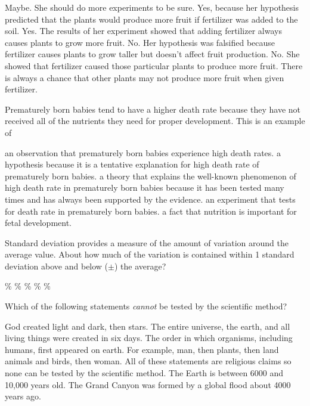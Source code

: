 \begin{choices}
\choice Maybe. She should do more experiments to be sure.
\choice Yes, because her hypothesis predicted that the plants would produce more fruit if fertilizer was added to the soil.
\choice Yes. The results of her experiment showed that adding fertilizer always causes plants to grow more fruit.
\choice No. Her hypothesis was falsified because fertilizer causes plants to grow taller but doesn't affect fruit production.
\correctchoice No. She showed that fertilizer caused those particular plants to produce more fruit. There is always a chance that other plants may not produce more fruit when given fertilizer.
\end{choices}

\question
Prematurely born babies tend to have a higher death rate because they have not received all of the nutrients they need for proper development. This is an example of

\begin{choices}
\choice an observation that prematurely born babies experience high death rates.
\correctchoice a hypothesis because it is a tentative explanation for high death rate of prematurely born babies.
\choice a theory that explains the well-known phenomenon of high death rate in prematurely born babies because it has been tested many times and has always been supported by the evidence.
\choice an experiment that tests for death rate in prematurely born babies.
\choice a fact that nutrition is important for fetal development.
\end{choices}

\question
Standard deviation provides a measure of the amount of variation around the average value. About how much of the variation is contained within 1 standard deviation above and below ($\pm$) the average?

\begin{choices}
\%
\%
\%
\%
\%
\end{choices}

\question
Which of the following statements \emph{cannot} be tested by the scientific method?

\begin{choices}
\correctchoice God created light and dark, then stars.
\choice The entire universe, the earth, and all living things were created in six days.
\choice The order in which organisms, including humans, first appeared on earth. For example, man, then plants, then land animals and birds, then woman.
\choice All of these statements are religious claims so none can be tested by the scientific method.
\choice The Earth is between 6000 and 10,000 years old.
\choice The Grand Canyon was formed by a global flood about 4000 years ago.
\end{choices}

